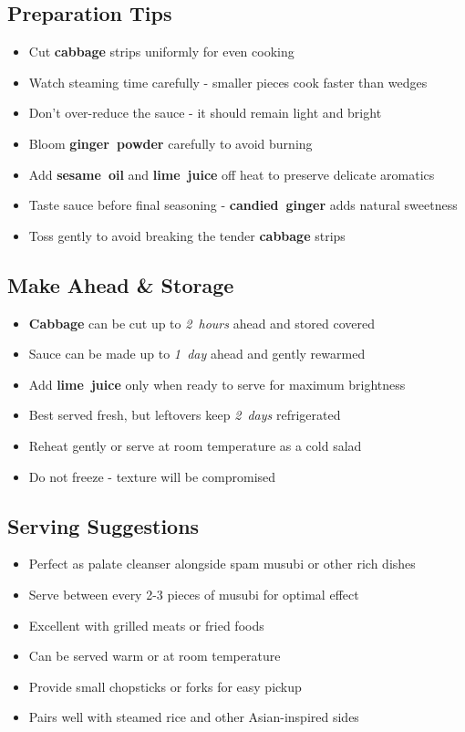\documentclass[11pt,letterpaper]{article}
\begin{document}
{\begin{multicols}{2}
\subsection*{Preparation Tips}
\begin{itemize}
    \item Cut \textbf{cabbage} strips uniformly for even cooking
    \item Watch steaming time carefully - smaller pieces cook faster than wedges
    \item Don't over-reduce the sauce - it should remain light and bright
    \item Bloom \textbf{ginger~powder} carefully to avoid burning
    \item Add \textbf{sesame~oil} and \textbf{lime~juice} off heat to preserve delicate aromatics
    \item Taste sauce before final seasoning - \textbf{candied~ginger} adds natural sweetness
    \item Toss gently to avoid breaking the tender \textbf{cabbage} strips
\end{itemize}

\subsection*{Make Ahead \& Storage}
\begin{itemize}
    \item \textbf{Cabbage} can be cut up to \textit{2~hours} ahead and stored covered
    \item Sauce can be made up to \textit{1~day} ahead and gently rewarmed
    \item Add \textbf{lime~juice} only when ready to serve for maximum brightness
    \item Best served fresh, but leftovers keep \textit{2~days} refrigerated
    \item Reheat gently or serve at room temperature as a cold salad
    \item Do not freeze - texture will be compromised
\end{itemize}

\subsection*{Serving Suggestions}
\begin{itemize}
    \item Perfect as palate cleanser alongside spam musubi or other rich dishes
    \item Serve between every 2-3 pieces of musubi for optimal effect
    \item Excellent with grilled meats or fried foods
    \item Can be served warm or at room temperature
    \item Provide small chopsticks or forks for easy pickup
    \item Pairs well with steamed rice and other Asian-inspired sides
\end{itemize}

\end{multicols}
}
\end{document}
